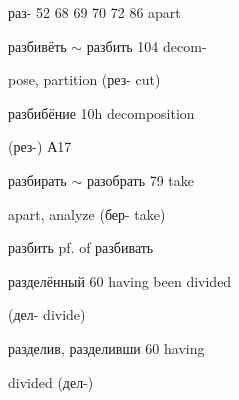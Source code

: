 \begin{minipage}[t]{0.475\textwidth}
\noindent раз- 52 68 69 70 72 86 apart\par
\noindent разбивёть $\sim$ разбить 104 decom-\par
\noindent pose, partition (рез- cut)\par
\noindent разбибёние 10h decomposition\par
\noindent (рез-) А17\par
\noindent разбирать $\sim$ разобрать 79 take\par
\noindent apart, analyze (бер- take)\par
\noindent разбить pf. of разбивать\par
\noindent разделённый 60 having been divided\par
\noindent (дел- divide)\par
\noindent разделив, разделивши 60 having\par
\noindent divided (дел-)\par
\end{minipage}
\endgroup


